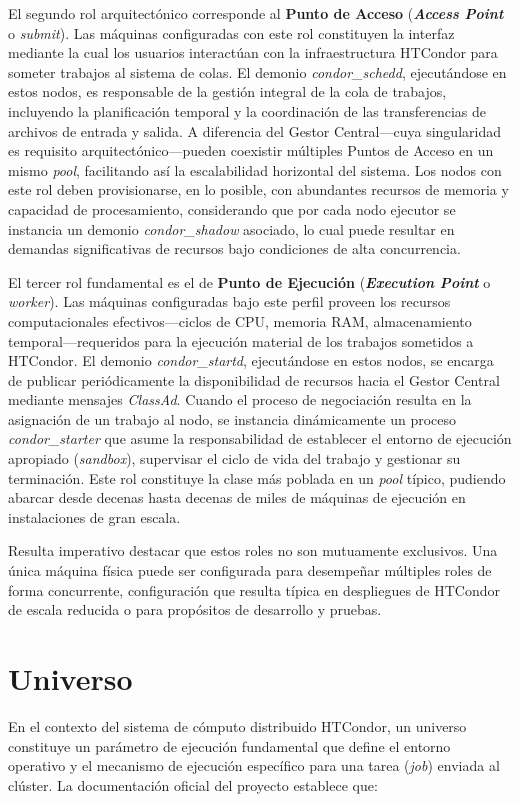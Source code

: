 El segundo rol arquitectónico corresponde al \textbf{Punto de Acceso} (\textbf{\textit{Access Point}} o \textit{submit}). Las máquinas configuradas con este rol constituyen la interfaz mediante la cual los usuarios interactúan con la infraestructura HTCondor para someter trabajos al sistema de colas. El demonio \textit{condor\_schedd}, ejecutándose en estos nodos, es responsable de la gestión integral de la cola de trabajos, incluyendo la planificación temporal y la coordinación de las transferencias de archivos de entrada y salida. A diferencia del Gestor Central---cuya singularidad es requisito arquitectónico---pueden coexistir múltiples Puntos de Acceso en un mismo \textit{pool}, facilitando así la escalabilidad horizontal del sistema. Los nodos con este rol deben provisionarse, en lo posible, con abundantes recursos de memoria y capacidad de procesamiento, considerando que por cada nodo ejecutor se instancia un demonio \textit{condor\_shadow} asociado, lo cual puede resultar en demandas significativas de recursos bajo condiciones de alta concurrencia.

El tercer rol fundamental es el de \textbf{Punto de Ejecución} (\textbf{\textit{Execution Point}} o \textit{worker}). Las máquinas configuradas bajo este perfil proveen los recursos computacionales efectivos---ciclos de CPU, memoria RAM, almacenamiento temporal---requeridos para la ejecución material de los trabajos sometidos a HTCondor. El demonio \textit{condor\_startd}, ejecutándose en estos nodos, se encarga de publicar periódicamente la disponibilidad de recursos hacia el Gestor Central mediante mensajes \textit{ClassAd}. Cuando el proceso de negociación resulta en la asignación de un trabajo al nodo, se instancia dinámicamente un proceso \textit{condor\_starter} que asume la responsabilidad de establecer el entorno de ejecución apropiado (\textit{sandbox}), supervisar el ciclo de vida del trabajo y gestionar su terminación. Este rol constituye la clase más poblada en un \textit{pool} típico, pudiendo abarcar desde decenas hasta decenas de miles de máquinas de ejecución en instalaciones de gran escala.

Resulta imperativo destacar que estos roles no son mutuamente exclusivos. Una única máquina física puede ser configurada para desempeñar múltiples roles de forma concurrente, configuración que resulta típica en despliegues de HTCondor de escala reducida o para propósitos de desarrollo y pruebas.\section{Universo}
\noindent
En el contexto del sistema de cómputo distribuido HTCondor, un universo constituye un parámetro de ejecución fundamental que define el entorno operativo y el mecanismo de ejecución específico para una tarea (\textit{job}) enviada al clúster. La documentación oficial del proyecto establece que:

